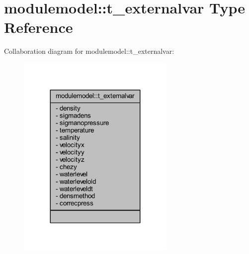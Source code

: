 \hypertarget{structmodulemodel_1_1t__externalvar}{}\section{modulemodel\+:\+:t\+\_\+externalvar Type Reference}
\label{structmodulemodel_1_1t__externalvar}


Collaboration diagram for modulemodel\+:\+:t\+\_\+externalvar\+:\nopagebreak
\begin{figure}[H]
\begin{center}
\leavevmode
\includegraphics[width=215pt]{structmodulemodel_1_1t__externalvar__coll__graph}
\end{center}
\end{figure}
